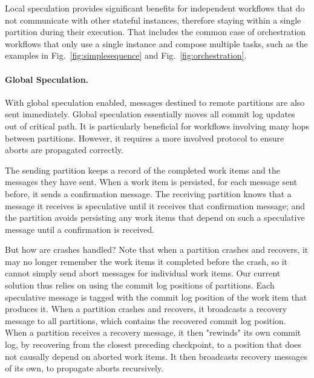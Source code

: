 Local speculation provides significant benefits for independent workflows that do not communicate with other stateful instances, therefore staying within a single partition during their execution. 
That includes the common case of orchestration workflows that only use a single instance and compose multiple tasks, such as the examples in Fig.~\ref{fig:simplesequence} and Fig.~\ref{fig:orchestration}. 


\paragraph{Global Speculation.} 

With global speculation enabled, messages destined to remote partitions are also sent immediately. 
Global speculation essentially moves all commit log updates out of critical path. It is particularly beneficial for workflows involving many hops between partitions. However, it requires a more involved protocol to ensure aborts are propagated correctly.

The sending partition keeps a record of the completed work items and the messages they have sent. When a work item is persisted, for each message sent before, it sends a confirmation message. The receiving partition knows that a message it receives is speculative until it receives that confirmation message; and the partition avoids persisting any work items that depend on such a speculative message until a confirmation is received.

But how are crashes handled? Note that when a partition crashes and recovers, it may no longer remember the work items it completed before the crash, so it cannot simply send abort messages for individual work items. Our current solution thus relies on using the commit log positions of partitions. Each speculative message is tagged with the commit log position of the work item that produces it. When a partition crashes and recovers, it broadcasts a recovery message to all partitions, which contains the recovered commit log position. When a partition receives a recovery message, it then "rewinds" its own commit log, by recovering from the closest preceding checkpoint, to a position that does not causally depend on aborted work items. It then broadcasts recovery messages of its own, to propagate aborts recursively. 
